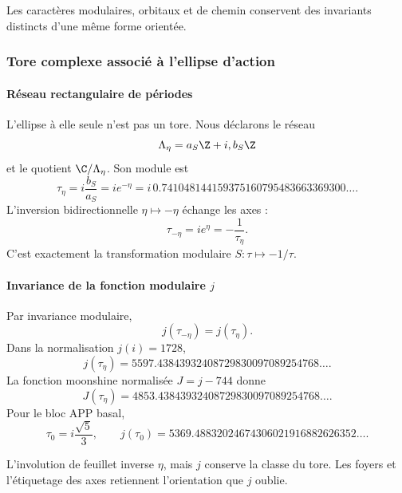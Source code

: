 \noindent Les caractères modulaires, orbitaux et de chemin conservent des invariants distincts d'une même forme orientée.\par\medskip

\subsubsection{Tore complexe associé à l'ellipse d'action}

\paragraph{Réseau rectangulaire de périodes}

L'ellipse à elle seule n'est pas un tore. Nous déclarons le réseau
\begin{equation}
\Lambda_\eta=a_S\Z+i,b_S\Z
\label{eq:lattice}
\end{equation}
et le quotient \(\C/\Lambda_\eta\). Son module est
\begin{equation}
\tau_\eta=i\frac{b_S}{a_S}=ie^{-\eta}
=i\,0.741048144159375160795483663369300\ldots.
\label{eq:tau-eta}
\end{equation}
L'inversion bidirectionnelle \(\eta\mapsto-\eta\) échange les axes :
\begin{equation}
\tau_{-\eta}=ie^\eta=-\frac1{\tau_\eta}.
\label{eq:modular-S}
\end{equation}
C'est exactement la transformation modulaire \(S:\tau\mapsto-1/\tau\).

\paragraph{Invariance de la fonction modulaire \(j\)}

Par invariance modulaire,
\begin{equation}
\boxed{j(\tau_{-\eta})=j(\tau_\eta).}
\label{eq:j-invariance}
\end{equation}
Dans la normalisation \(j(i)=1728\),
\[
j(\tau_\eta)
=5597.43843932408729830097089254768\ldots.
\]
La fonction moonshine normalisée \(J=j-744\) donne
\[
J(\tau_\eta)
=4853.43843932408729830097089254768\ldots.
\]
Pour le bloc APP basal,
\[
\tau_0=i\frac{\sqrt5}{3},
\qquad
j(\tau_0)=5369.48832024674306021916882626352\ldots.
\]

\begin{proposition}
L'involution de feuillet inverse \(\eta\), mais \(j\) conserve la classe du
tore. Les foyers et l'étiquetage des axes retiennent l'orientation que \(j\)
oublie.
\end{proposition}

